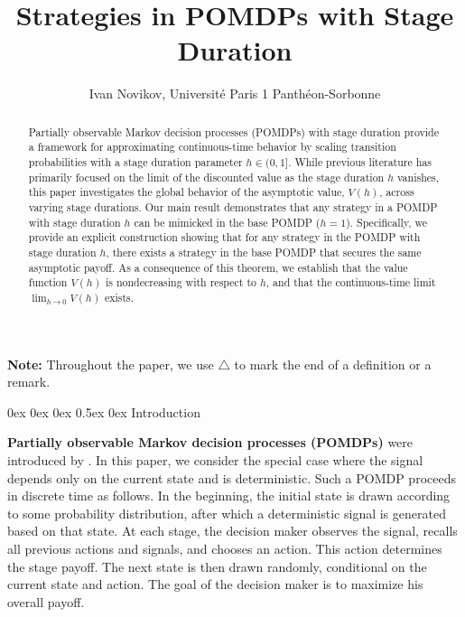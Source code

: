 \documentclass[english,openary,11pt]{article}
\makeatletter
\renewcommand\section{\@startsection {section}{1}{\z@}%
                                   {0ex \@plus 0ex \@minus 0ex}%
                                   {0.5ex \@plus0ex}%
                                   {\normalfont\LARGE\bfseries}}%
\theoremstyle{definition}
\makeatother
\begin{document}
\author{Ivan Novikov, Université Paris 1 Panthéon-Sorbonne}
\title{Strategies in POMDPs with Stage Duration}
\date{}

\maketitle

\begin{abstract}
Partially observable Markov decision processes (POMDPs) with stage duration provide a framework for approximating continuous-time behavior by scaling transition probabilities with a stage duration parameter $h \in (0,1]$. While previous literature has primarily focused on the limit of the discounted value as the stage duration $h$ vanishes, this paper investigates the global behavior of the asymptotic value, $V(h)$, across varying stage durations. Our main result demonstrates that any strategy in a POMDP with stage duration $h$ can be mimicked in the base POMDP ($h=1$). Specifically, we provide an explicit construction showing that for any strategy in the POMDP with stage duration $h$, there exists a strategy in the base POMDP that secures the same asymptotic payoff. As a consequence of this theorem, we establish that the value function $V(h)$ is nondecreasing with respect to $h$, and that the continuous-time limit $\lim_{h \to 0} V(h)$ exists.
\end{abstract}


\tableofcontents


\newpage 

\textbf{Note:} Throughout the paper, we use $\triangle$ to mark the end of a definition or a remark.

\section{Introduction}

\textbf{Partially observable Markov decision processes (POMDPs)} were introduced by \cite{Dra62}. In this paper, we consider the special case where the signal depends only on the current state and is deterministic. Such a POMDP proceeds in discrete time as follows. In the beginning, the initial state is drawn according to some probability distribution, after which a deterministic signal is generated based on that state. At each stage, the decision maker observes the signal, recalls all previous actions and signals, and chooses an action. This action determines the stage payoff. The next state is then drawn randomly, conditional on the current state and action. The goal of the decision maker is to maximize his overall payoff. 
\end{document}
